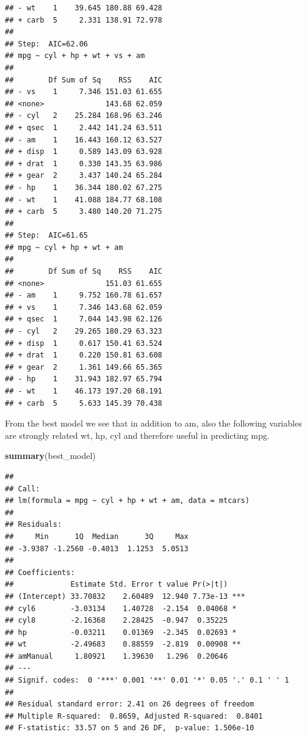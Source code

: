 \documentclass[]{article}
\newenvironment{Shaded}{\begin{snugshade}}{\end{snugshade}}
\newcommand{\KeywordTok}[1]{\textcolor[rgb]{0.13,0.29,0.53}{\textbf{{#1}}}}
\newcommand{\NormalTok}[1]{{#1}}
\begin{document}
\begin{verbatim}
## - wt    1    39.645 180.88 69.428
## + carb  5     2.331 138.91 72.978
## 
## Step:  AIC=62.06
## mpg ~ cyl + hp + wt + vs + am
## 
##        Df Sum of Sq    RSS    AIC
## - vs    1     7.346 151.03 61.655
## <none>              143.68 62.059
## - cyl   2    25.284 168.96 63.246
## + qsec  1     2.442 141.24 63.511
## - am    1    16.443 160.12 63.527
## + disp  1     0.589 143.09 63.928
## + drat  1     0.330 143.35 63.986
## + gear  2     3.437 140.24 65.284
## - hp    1    36.344 180.02 67.275
## - wt    1    41.088 184.77 68.108
## + carb  5     3.480 140.20 71.275
## 
## Step:  AIC=61.65
## mpg ~ cyl + hp + wt + am
## 
##        Df Sum of Sq    RSS    AIC
## <none>              151.03 61.655
## - am    1     9.752 160.78 61.657
## + vs    1     7.346 143.68 62.059
## + qsec  1     7.044 143.98 62.126
## - cyl   2    29.265 180.29 63.323
## + disp  1     0.617 150.41 63.524
## + drat  1     0.220 150.81 63.608
## + gear  2     1.361 149.66 65.365
## - hp    1    31.943 182.97 65.794
## - wt    1    46.173 197.20 68.191
## + carb  5     5.633 145.39 70.438
\end{verbatim}

From the best model we see that in addition to am, also the following
variables are strongly related wt, hp, cyl and therefore useful in
predicting mpg.

\begin{Shaded}
\begin{Highlighting}[]
\KeywordTok{summary}\NormalTok{(best_model)}
\end{Highlighting}
\end{Shaded}

\begin{verbatim}
## 
## Call:
## lm(formula = mpg ~ cyl + hp + wt + am, data = mtcars)
## 
## Residuals:
##     Min      1Q  Median      3Q     Max 
## -3.9387 -1.2560 -0.4013  1.1253  5.0513 
## 
## Coefficients:
##             Estimate Std. Error t value Pr(>|t|)    
## (Intercept) 33.70832    2.60489  12.940 7.73e-13 ***
## cyl6        -3.03134    1.40728  -2.154  0.04068 *  
## cyl8        -2.16368    2.28425  -0.947  0.35225    
## hp          -0.03211    0.01369  -2.345  0.02693 *  
## wt          -2.49683    0.88559  -2.819  0.00908 ** 
## amManual     1.80921    1.39630   1.296  0.20646    
## ---
## Signif. codes:  0 '***' 0.001 '**' 0.01 '*' 0.05 '.' 0.1 ' ' 1
## 
## Residual standard error: 2.41 on 26 degrees of freedom
## Multiple R-squared:  0.8659, Adjusted R-squared:  0.8401 
## F-statistic: 33.57 on 5 and 26 DF,  p-value: 1.506e-10
\end{verbatim}
\end{document}
